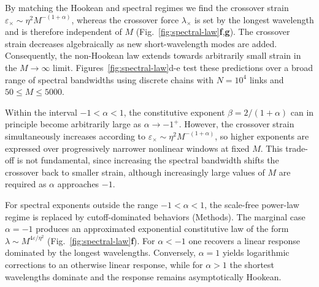 \documentclass[pdflatex, twocolumn, sn-nature]{sn-jnl}
\begin{document}
By matching the Hookean and spectral regimes we find the crossover strain $\varepsilon_\times \sim \eta^2M^{-(1+\alpha)}$, whereas the crossover force $\lambda_\times$ is set by the longest wavelength and is therefore independent of $M$ (Fig.~\ref{fig:spectral-law}\textbf{f},\textbf{g}).
The crossover strain decreases algebraically as new short-wavelength modes are added. Consequently, the non-Hookean law extends towards arbitrarily small strain in the $M\rightarrow\infty$ limit.
Figures~\ref{fig:spectral-law}d-e test these predictions over a broad range of spectral bandwidths using discrete chains with \(N=10^4\) links and
\(50\leq M\leq5000\).


Within the interval $-1<\alpha<1$, the constitutive exponent $\beta=2/(1+\alpha)$ can in principle become arbitrarily large as $\alpha\to-1^{+}$. However, the crossover strain simultaneously increases according to $\varepsilon_{\times}\sim\eta^{2}M^{-(1+\alpha)}$, so higher exponents are expressed over progressively narrower nonlinear windows at fixed $M$. This trade-off is not fundamental, since increasing the spectral bandwidth shifts the crossover back to smaller strain, although increasingly large values of $M$ are required as $\alpha$ approaches $-1$.

For spectral exponents outside the range $-1<\alpha<1$, the scale-free power-law regime is replaced by cutoff-dominated behaviors (Methods). The marginal case $\alpha=-1$ produces an approximated exponential constitutive law of the form $\lambda\sim M^{4\varepsilon/\eta^2}$ (Fig.~\eqref{fig:spectral-law}\textbf{f}). For $\alpha<-1$ one recovers a linear response dominated by the longest wavelengths. Conversely, $\alpha=1$ yields logarithmic corrections to an otherwise linear response, while for $\alpha>1$ the shortest wavelengths dominate and the response remains asymptotically Hookean. 

\end{document}
